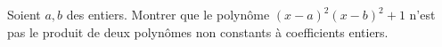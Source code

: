 Soient $a, b$ des entiers. Montrer que le polynôme $(x - a)^2(x - b)^2 + 1$ n'est pas le produit de deux polynômes non constants à coefficients entiers.
